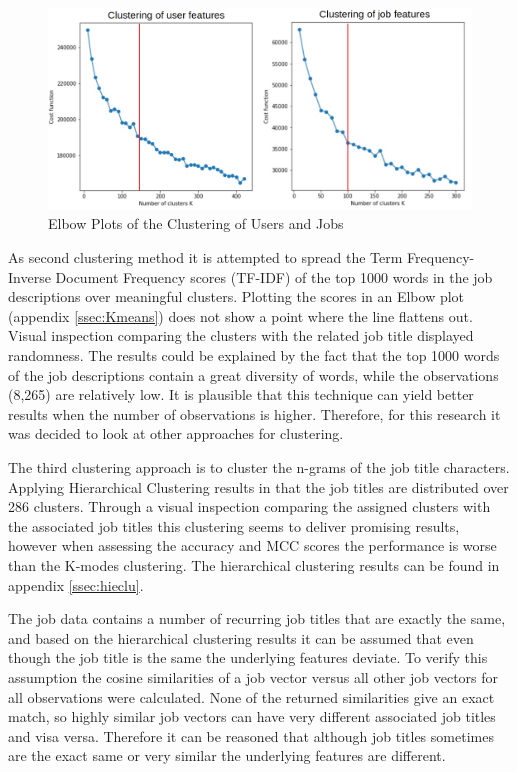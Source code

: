 \begin{figure}[H]
    \centering
    \includegraphics[width=\linewidth]{ThesisTemplate/Images/Clustering.png}
    \caption{\label{fig:eb} \footnotesize{Elbow Plots of the Clustering of Users and Jobs}}
\end{figure}

As second clustering method it is attempted to spread the Term Frequency-Inverse Document Frequency scores (TF-IDF) of the top 1000 words in the job descriptions over meaningful clusters.
Plotting the scores in an Elbow plot (appendix \ref{ssec:Kmeans}) does not show a point where the line flattens out.
Visual inspection comparing the clusters with the related job title displayed randomness.
The results could be explained by the fact that the top 1000 words of the job descriptions contain a great diversity of words, while the observations (8,265) are relatively low.
It is plausible that this technique can yield better results when the number of observations is higher.
Therefore, for this research it was decided to look at other approaches for clustering.

The third clustering approach is to cluster the n-grams of the job title characters.
Applying Hierarchical Clustering results in that the job titles are distributed over 286 clusters. 
Through a visual inspection comparing the assigned clusters with the associated job titles this clustering seems to deliver promising results, however when assessing the accuracy and MCC scores the performance is worse than the K-modes clustering.
The hierarchical clustering results can be found in appendix \ref{ssec:hieclu}.

The job data contains a number of recurring job titles that are exactly the same, and based on the hierarchical clustering results it can be assumed that even though the job title is the same the underlying features deviate. 
To verify this assumption the cosine similarities of a job vector versus all other job vectors for all observations were calculated.
None of the returned similarities give an exact match, so highly similar job vectors can have very different associated job titles and visa versa.
Therefore it can be reasoned that although job titles sometimes are the exact same or very similar the underlying features are different.

